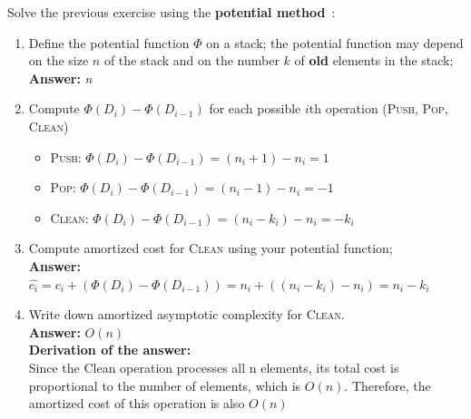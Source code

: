 \documentclass[dvipsnames]{article}
\begin{document}
\begin{enumerate}
{  \item Solve the previous exercise using the \textbf{potential method}~\cite[\S 16.3]{Cormen2022}:
  \begin{enumerate}
    \item Define the potential function $\Phi$ on a stack;
    the potential function may depend on the size $n$ of the stack and on the number $k$ of \textbf{old} elements in the stack;
    \color{blue}
    \\ \textbf{Answer:} \emph{n}
    \color{black}
    \item Compute $\Phi(D_i) - \Phi(D_{i-1})$ for each possible $i$th operation (\textsc{Push}, \textsc{Pop}, \textsc{Clean})
    \color{blue}
    \begin{itemize}
    \item \textsc{Push}: $\Phi(D_i) - \Phi(D_{i-1}) = (n_i + 1) - n_i = 1$
    \item \textsc{Pop}: $\Phi(D_i) - \Phi(D_{i-1}) = (n_i - 1) - n_i = -1$
    \item \textsc{Clean}: $\Phi(D_i) - \Phi(D_{i-1}) = (n_i - k_i) - n_i = -k_i$
    \end{itemize}
    \color{black}
\item Compute amortized cost for \textsc{Clean} using your potential function;
\color{blue} \\
\textbf{Answer:} \emph{$\hat{c_i} = c_i + (\Phi(D_i) - \Phi(D_{i-1})) = n_i + ((n_i - k_i) - n_i) = n_i - k_i$}
\color{black}

\item Write down amortized asymptotic complexity for \textsc{Clean}.
\color{blue} \\
\textbf{Answer:} \emph{  $O(n)$  } \\
\textbf{Derivation of the answer: }\\
\hspace*{7mm}
Since the Clean operation processes all n elements, its total cost is proportional to the number of elements, which is $O(n)$. Therefore, the amortized cost of this operation is also $O(n)$\\
\color{black}
  



\end{enumerate}}
\end{enumerate}
\end{document}
